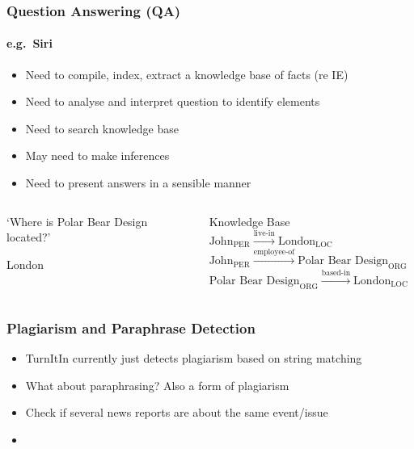 \begin{frame}
\frametitle{Question Answering (QA)}
\framesubtitle{e.g.~Siri}

\begin{itemize}[<+->]
\item Need to compile, index, extract a knowledge base of facts (re IE)
\item Need to analyse and interpret question to identify elements
\item Need to search knowledge base
\item May need to make inferences
\item Need to present answers in a sensible manner
\end{itemize}

\begin{columns}[T]
\begin{column}{.35\linewidth}
\begin{description}[Q:]
\item[Q:] `Where is Polar Bear Design located?'
\item[A:] London
\end{description}
\end{column}

\pause

\begin{column}{.64\linewidth}
\begin{exampleblock}{Knowledge Base}
	$\text{John}_\text{PER} \xrightarrow{\text{live-in}} \text{London}_\text{LOC}$\\
	$\text{John}_\text{PER} \xrightarrow{\text{employee-of}} \text{Polar Bear Design}_\text{ORG}$\\
	\alert{$\text{Polar Bear Design}_\text{ORG} \xrightarrow{\text{based-in}} \text{London}_\text{LOC}$}
\end{exampleblock}
\end{column}
\end{columns}

\end{frame}


\begin{frame}[allowframebreaks]
\frametitle{Plagiarism and Paraphrase Detection}
    
\begin{itemize}[<+->]
\item TurnItIn currently just detects plagiarism based on string matching
\item What about paraphrasing? Also a form of plagiarism
\item Check if several news reports are about the same event/issue
\item \parencite{li2006sentence,pera2011simpad}
\end{itemize}
\end{frame}


